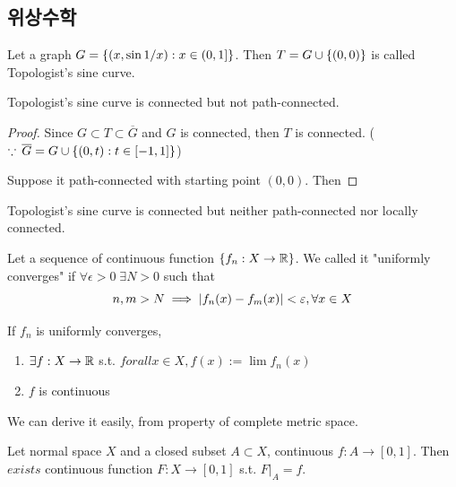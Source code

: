 \documentclass{article}
\begin{document}
\subsection{위상수학}

\begin{definition}
    Let a graph $G=\left\{ (x,\sin{1/x}) : x \in (0,1] \right\}$. Then $T=G \cup \left\{ (0,0) \right\}$ is called Topologist's sine curve.
\end{definition}

\begin{proposition}
    Topologist's sine curve is connected but not path-connected.
\end{proposition}

\begin{proof}
    Since $G \subset T \subset \overline{G}$ and $G$ is connected, then $T$ is connected. ($\because \,\overline{G}=G \cup \left\{ (0,t): t \in [-1,1] \right\}$)

    Suppose it path-connected with starting point $(0,0)$. Then 
\end{proof}

Topologist's sine curve is connected but neither path-connected nor locally connected.

\begin{definition}
    Let a sequence of continuous function $\left\{ f_n : X \to \mathbb{R} \right\}$. We called it "uniformly converges" if $\forall \epsilon > 0 \; \exists N > 0$ such that
    \[
        n,m>N \implies \lvert f_n(x)-f_m(x)\rvert < \varepsilon, \forall x \in X
    \]
\end{definition}

\begin{proposition}
    If $f_n$ is uniformly converges, 
    \begin{enumerate}
        \item $\exists f: X \to \mathbb{R}$ s.t. $forall x \in X, f(x):=\lim f_n(x)$ 
        \item $f$ is continuous
    \end{enumerate}
\end{proposition}

We can derive it easily, from property of complete metric space. 

\begin{theorem}
    Let normal space $X$ and a closed subset $A \subset X$, continuous $f : A \to [0,1]$. Then $exists$ continuous function $F: X \to [0,1]$ s.t. $F|_A = f$.
    \label{theorem:tietz_extension}
\end{theorem}
\end{document}
